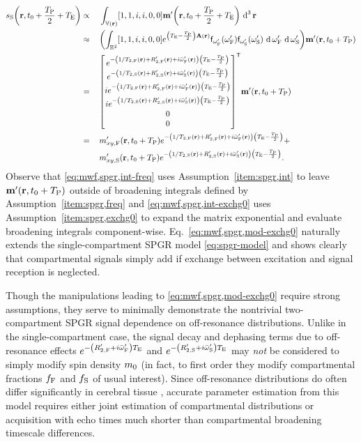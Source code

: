 \begin{alignat}{2}
	\spgr\paren{\bmr,t_0+\frac{\TP}{2}+\TE} 
		&\propto&
			&\int_{\setV\pr} \brac{1, 1, i, i, 0, 0} \bmmp\paren{\bmr,t_0+\frac{\TP}{2}+\TE} \dercubed{\bmr} 
			\label{eq:mwf,spgr,int} \\
		&\approx& 
			&\paren{\int_{\real^2} \brac{1, 1, i, i, 0, 0}
				e^{\paren{\TE-\frac{\TP}{2}}\bmA\pr} 
				\dista{\ompf} \dista{\omps} \der{\ompf} \der{\omps}} 
				\bmmp\paren{\bmr,t_0+\TP} 
				\label{eq:mwf,spgr,int-freq} \\
		&=&
			&\begin{bmatrix}
				e^{-\paren{1/\tf{2}\pr+\Rtpf\pr+i\ompfmed\pr}\paren{\TE-\frac{\TP}{2}}} \\
				e^{-\paren{1/\ts{2}\pr+\Rtps\pr+i\ompsmed\pr}\paren{\TE-\frac{\TP}{2}}} \\
				ie^{-\paren{1/\tf{2}\pr+\Rtpf\pr+i\ompfmed\pr}\paren{\TE-\frac{\TP}{2}}} \\
				ie^{-\paren{1/\ts{2}\pr+\Rtps\pr+i\ompsmed\pr}\paren{\TE-\frac{\TP}{2}}} \\
				0 \\
				0
			\end{bmatrix}
			\tpose \bmmp\paren{\bmr,t_0+\TP}
			\label{eq:mwf,spgr,int-exchg0} \\
		&=\,& 
			&\mxypf\paren{\bmr,t_0+\TP} 
				e^{-\paren{1/\tf{2}\pr+\Rtpf\pr+i\ompfmed\pr}\paren{\TE-\frac{\TP}{2}}} +
				\nonumber \\
		&& 
			&\mxyps\paren{\bmr,t_0+\TP} 
				e^{-\paren{1/\ts{2}\pr+\Rtps\pr+i\ompsmed\pr}\paren{\TE-\frac{\TP}{2}}}.
			\label{eq:mwf,spgr,mod-exchg0}
\end{alignat}
Observe that \eqref{eq:mwf,spgr,int-freq}
uses Assumption~\ref{item:spgr,int}
to leave $\bmmp\paren{\bmr,t_0+\TP}$
outside of broadening integrals
defined by Assumption~\ref{item:spgr,freq}
and 
\eqref{eq:mwf,spgr,int-exchg0}
uses Assumption~\ref{item:spgr,exchg0}
to expand the matrix exponential
and evaluate broadening integrals component-wise.
Eq.~\eqref{eq:mwf,spgr,mod-exchg0} naturally extends
the single-compartment SPGR model \eqref{eq:spgr-model} 
and shows clearly
that compartmental signals simply add
if exchange between excitation and signal reception is neglected. 

Though the manipulations leading
to \eqref{eq:mwf,spgr,mod-exchg0} require strong assumptions,
they serve to minimally demonstrate 
the nontrivial two-compartment SPGR signal dependence
on off-resonance distributions.
Unlike in the single-compartment case,
the signal decay and dephasing terms
due to off-resonance effects
$e^{-\paren{\Rtpf+i\ompfmed}\TE}$ and $e^{-\paren{\Rtps+i\ompsmed}\TE}$
may \emph{not} be considered
to simply modify spin density $m_0$
(in fact,
to first order
they modify compartmental fractions $f_{\mathrm{F}}$ and $f_{\mathrm{S}}$
of usual interest).
Since off-resonance distributions
do often differ significantly in cerebral tissue
\cite{miller:10:aot-I, miller:10:aot-II}, 
accurate \invivo parameter estimation
from this model 
requires either joint estimation
of compartmental distributions
or acquisition with echo times much shorter
than compartmental broadening timescale differences. 

